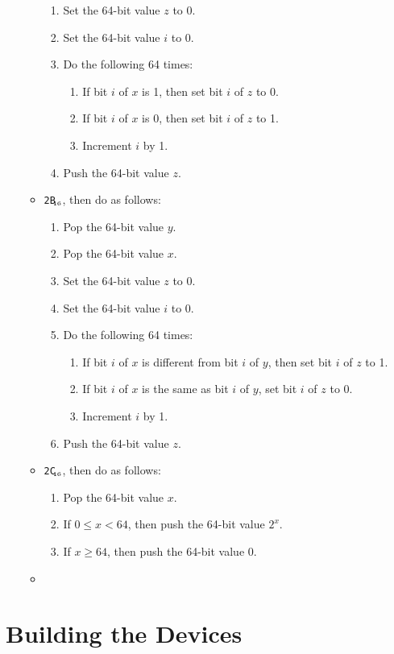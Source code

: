 \documentclass[a4paper,12pt]{article}
\newcommand{\num}[1]{\texttt{#1}\xspace}
\newcommand{\hex}[1]{\num{#1}$_{\textup{\tiny\hskip-1ex 16}}$\xspace}
\newcommand{\op}[1]{#1}
\newcommand{\XOR}       [1]{\op{\hex{2B}}\xspace}
\newcommand{\POW}       [1]{\op{\hex{2C}}\xspace}
\begin{document}
\begin{enumerate}
\begin{itemize}
\begin{enumerate}
    \item Set the 64-bit value $z$ to 0.
    \item Set the 64-bit value $i$ to 0.
    \item Do the following 64 times:
      \begin{enumerate}
      \item If bit $i$ of $x$ is 1, then set bit $i$ of $z$ to 0.
      \item If bit $i$ of $x$ is 0, then set bit $i$ of $z$ to 1.
      \item Increment $i$ by 1.
      \end{enumerate}
    \item Push the 64-bit value $z$.
    \end{enumerate}
  \item \XOR{}, then do as follows:
    \begin{enumerate}
    \item Pop the 64-bit value $y$.
    \item Pop the 64-bit value $x$.
    \item Set the 64-bit value $z$ to 0.
    \item Set the 64-bit value $i$ to 0.
    \item Do the following 64 times:
      \begin{enumerate}
      \item If bit $i$ of $x$ is different from bit $i$ of $y$, then set bit $i$ of $z$ to 1.
      \item If bit $i$ of $x$ is the same as bit $i$ of $y$, set bit $i$ of $z$ to 0.
      \item Increment $i$ by 1.
      \end{enumerate}
    \item Push the 64-bit value $z$.
    \end{enumerate}
  \item \POW{}, then do as follows:
    \begin{enumerate}
    \item Pop the 64-bit value $x$.
    \item If $0 \le x < 64$, then push the 64-bit value $2^x$.
    \item If $x \ge 64$, then push the 64-bit value 0.
    \end{enumerate}
  \item \
  \end{itemize}
\end{enumerate}

\section{Building the Devices}
\label{sec:building-devices}
\end{document}
